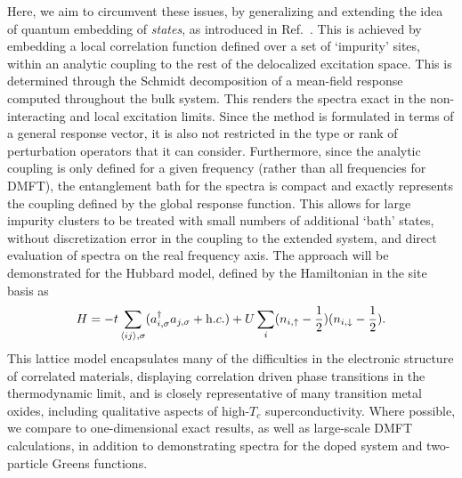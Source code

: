 \documentclass[aps,showpacs,twocolumn,nobibnotes]{revtex4}
\begin{document}
Here, we aim to circumvent these issues, by generalizing and extending the idea of quantum embedding of {\em states}, as introduced in 
Ref.~. This is achieved by embedding a local correlation function defined over a set of `impurity' sites, within an 
analytic coupling to the rest of the delocalized excitation space. This is determined through the Schmidt decomposition of a mean-field 
response computed throughout the bulk system. This renders the spectra exact in the non-interacting and local excitation limits. 
Since the method is formulated in terms of a general response vector, it is also not restricted in the type or rank of perturbation 
operators that it can consider. Furthermore, since the analytic coupling is only defined for a given frequency (rather than all frequencies 
for DMFT), the entanglement bath for the spectra is compact and exactly represents the coupling defined by the global response function. This 
allows for large impurity clusters to be treated with small numbers of additional `bath' states, without discretization error in the coupling 
to the extended system, and direct evaluation of spectra on the real frequency axis. The approach will be demonstrated for the Hubbard model, 
defined by the Hamiltonian in the site basis as
\begin{equation}
    H = -t \sum_{\langle ij \rangle, \sigma} (a_{i,\sigma}^{\dagger}a_{j,\sigma} + {\textrm h.c.}) + U \sum_i (n_{i,\uparrow} - \frac{1}{2})(n_{i,\downarrow} - \frac{1}{2})  . \label{eqn:hub}
\end{equation}
This lattice model encapsulates many of the difficulties in the electronic structure of correlated materials, displaying correlation driven 
phase transitions in the thermodynamic limit, and is closely representative of many transition metal oxides\cite{Limelette2003}, including qualitative aspects 
of high-$T_c$ superconductivity\cite{Millis2013,Anderson87}. Where possible, we compare to one-dimensional exact results\cite{Lieb68,Ovchinni1970}, as 
well as large-scale DMFT calculations\cite{Go2009,Kotliar2008}, in addition to demonstrating spectra for the doped system and two-particle Greens functions.
\end{document}
